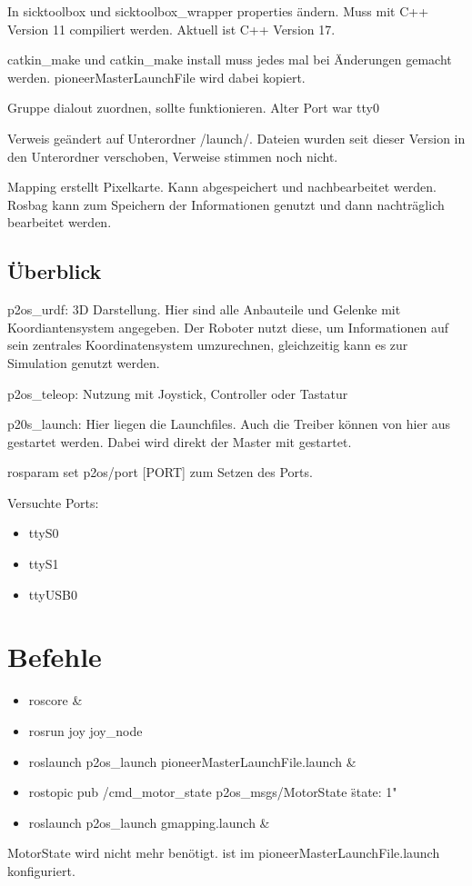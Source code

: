\documentclass{scrartcl}%
\begin{document}
In sicktoolbox und sicktoolbox\_wrapper properties ändern. Muss mit C++ Version 11 compiliert werden. Aktuell ist C++ Version 17.

catkin\_make und catkin\_make install muss jedes mal bei Änderungen gemacht werden. pioneerMasterLaunchFile wird dabei kopiert.

Gruppe dialout zuordnen, sollte funktionieren. Alter Port war tty0

Verweis geändert auf Unterordner /launch/. Dateien wurden seit dieser Version in den Unterordner verschoben, Verweise stimmen noch nicht.

Mapping erstellt Pixelkarte. Kann abgespeichert und nachbearbeitet werden. Rosbag kann zum Speichern der Informationen genutzt und dann nachträglich bearbeitet werden.

\subsection{Überblick}
p2os\_urdf: 3D Darstellung. Hier sind alle Anbauteile und Gelenke mit Koordiantensystem angegeben. Der Roboter nutzt diese, um Informationen auf sein zentrales Koordinatensystem umzurechnen, gleichzeitig kann es zur Simulation genutzt werden.

p2os\_teleop: Nutzung mit Joystick, Controller oder Tastatur

p20s\_launch: Hier liegen die Launchfiles. Auch die Treiber können von hier aus gestartet werden. Dabei wird direkt der Master mit gestartet.

rosparam set p2os/port [PORT] zum Setzen des Ports.

Versuchte Ports: 
\begin{itemize}
	\item ttyS0
	\item ttyS1
	\item ttyUSB0
\end{itemize}

\section{Befehle}

\begin{itemize}
	\item roscore \&
	\item rosrun joy joy\_node
	\item roslaunch p2os\_launch pioneerMasterLaunchFile.launch \&
	\item rostopic pub /cmd\_motor\_state p2os\_msgs/MotorState \"state: 1"
	\item roslaunch p2os\_launch gmapping.launch \&
\end{itemize}
MotorState wird nicht mehr benötigt. ist im pioneerMasterLaunchFile.launch konfiguriert.
\end{document}
